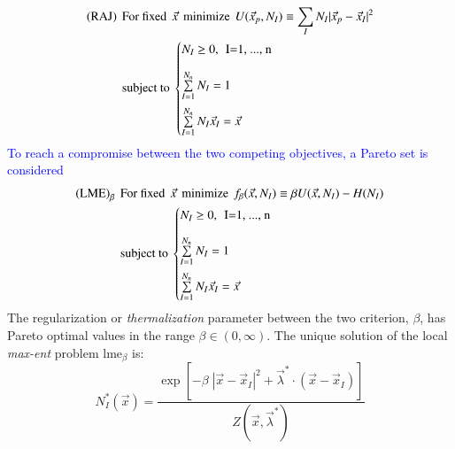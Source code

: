 \documentclass[preprint,12pt,a4paper]{elsarticle}
\begin{document}
\begin{align*}
  \text{(RAJ)} \hspace{0.15cm} &\text{For fixed} \hspace{0.15cm}
  \vec{x} \hspace{0.15cm} \text{minimize} \hspace{0.15cm} U(\vec{x}_p,N_I) \equiv
\sum_I N_I |\vec{x}_p - \vec{x}_I |^2\\
  &\text{subject to}\
  \begin{cases}
    N_I \ge 0, \hspace{0.15cm} \text{I=1, ..., n} \\[1em]   
    \sum\limits_{I=1}^{N_n}{N_I} = 1 \\[1em]   
    \sum\limits_{I=1}^{N_n}{N_I \vec{x}_I} = \vec{x} \\
  \end{cases}
\end{align*}
\textcolor{blue}{To reach a compromise between the two competing objectives, a Pareto set is considered}  \cite{Arroyo2006}
\begin{align*}
  \text{(LME)}_{\beta} \hspace{0.15cm} &\text{For fixed} \hspace{0.15cm}
  \vec{x} \hspace{0.15cm} \text{minimize} \hspace{0.15cm} f_{\beta}(\vec{x}, N_I) \equiv \beta U(\vec{x},N_I) - H(N_I) \\
  &\text{subject to}\
  \begin{cases}
    N_I \ge 0, \hspace{0.15cm} \text{I=1, ..., n} \\[1em]   
    \sum\limits_{I=1}^{N_n}{N_I} = 1 \\[1em]   
    \sum\limits_{I=1}^{N_n}{N_I \vec{x}_I} = \vec{x} \\
  \end{cases}
\end{align*}
The regularization or \textit{thermalization} parameter
between the two criterion, $\beta$, has Pareto optimal values in the range
$\beta \in (0,\infty)$. The unique solution of
the local \textit{max-ent} problem \acrshort{lme}$_\beta$ is:
\begin{equation}
  \label{eq:LME-p}
N_I^*(\vec{x})=\frac{\exp\left[ -\beta \; |\vec{x}-\vec{x}_I|^2 +
    \vec{\lambda}^* \cdot (\vec{x}-\vec{x}_I) \right] } {Z(\vec{x},\vec{\lambda}^*)}
\end{equation}
\end{document}
